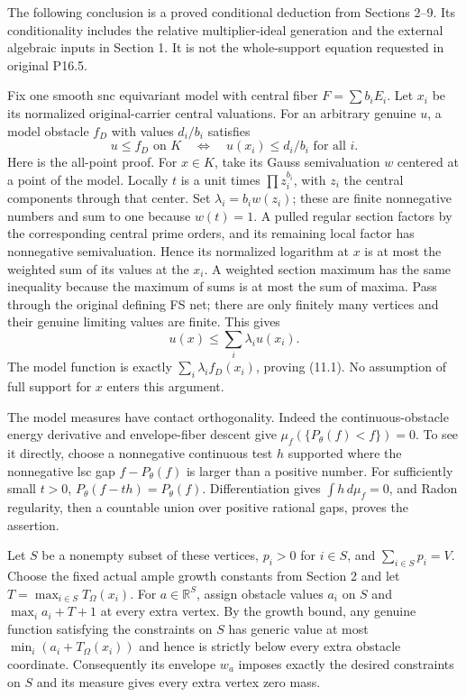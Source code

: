 \documentclass[
  10pt,
]{article}
\begin{document}
The following conclusion is a proved conditional deduction from Sections
2--9. Its conditionality includes the relative multiplier-ideal
generation and the external algebraic inputs in Section 1. It is not the
whole-support equation requested in original P16.5.

Fix one smooth snc equivariant model with central fiber
\(F=\sum b_iE_i\). Let \(x_i\) be its normalized original-carrier
central valuations. For an arbitrary genuine \(u\), a model obstacle
\(f_D\) with values \(d_i/b_i\) satisfies \[u\leq f_D\text{ on }K
\quad\Longleftrightarrow\quad
u(x_i)\leq d_i/b_i\text{ for all }i.\tag{11.1}\] Here is the all-point
proof. For \(x\in K\), take its Gauss semivaluation \(w\) centered at a
point of the model. Locally \(t\) is a unit times \(\prod z_i^{b_i}\),
with \(z_i\) the central components through that center. Set
\(\lambda_i=b_iw(z_i)\); these are finite nonnegative numbers and sum to
one because \(w(t)=1\). A pulled regular section factors by the
corresponding central prime orders, and its remaining local factor has
nonnegative semivaluation. Hence its normalized logarithm at \(x\) is at
most the weighted sum of its values at the \(x_i\). A weighted section
maximum has the same inequality because the maximum of sums is at most
the sum of maxima. Pass through the original defining FS net; there are
only finitely many vertices and their genuine limiting values are
finite. This gives \[u(x)\leq\sum_i\lambda_i u(x_i).\] The model
function is exactly \(\sum_i\lambda_i f_D(x_i)\), proving (11.1). No
assumption of full support for \(x\) enters this argument.

The model measures have contact orthogonality. Indeed the
continuous-obstacle energy derivative and envelope-fiber descent give
\(\mu_f(\{P_\theta(f)<f\})=0\). To see it directly, choose a nonnegative
continuous test \(h\) supported where the nonnegative lsc gap
\(f-P_\theta(f)\) is larger than a positive number. For sufficiently
small \(t>0\), \(P_\theta(f-th)=P_\theta(f)\). Differentiation gives
\(\int h\,d\mu_f=0\), and Radon regularity, then a countable union over
positive rational gaps, proves the assertion.

Let \(S\) be a nonempty subset of these vertices, \(p_i>0\) for
\(i\in S\), and \(\sum_{i\in S}p_i=V\). Choose the fixed actual ample
growth constants from Section 2 and let
\(T=\max_{i\in S}T_\Omega(x_i)\). For \(a\in\mathbb R^S\), assign
obstacle values \(a_i\) on \(S\) and \(\max_i a_i+T+1\) at every extra
vertex. By the growth bound, any genuine function satisfying the
constraints on \(S\) has generic value at most
\(\min_i(a_i+T_\Omega(x_i))\) and hence is strictly below every extra
obstacle coordinate. Consequently its envelope \(w_a\) imposes exactly
the desired constraints on \(S\) and its measure gives every extra
vertex zero mass.
\end{document}
